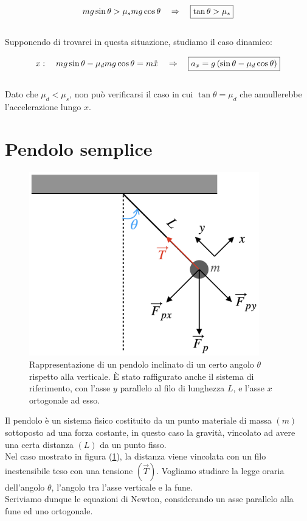 \begin{equation}
    mg\sin\theta > \mu_s mg\cos\theta\quad\Rightarrow\quad \boxed{\tan\theta>\mu_s}
\end{equation}
\\
Supponendo di trovarci in questa situazione, studiamo il caso dinamico:

\begin{equation}
    x:\quad mg\sin\theta -\mu_d mg\cos\theta = m\ddot x\quad\Rightarrow\quad
    \boxed{a_x = g\left(\sin\theta-\mu_d\cos\theta\right)}
\end{equation}
\\
Dato che $\mu_d<\mu_s$, non può verificarsi il caso in cui $\tan\theta
=\mu_d$ che annullerebbe l'accelerazione lungo $x$.

\section{Pendolo semplice}
\begin{figure}[htbp]
\center
        \includegraphics[width=10cm]{images/pendolo.png}
        \caption{Rappresentazione di un pendolo inclinato di un certo angolo
        $\theta$ rispetto alla verticale. È stato raffigurato anche il sistema
        di riferimento, con l'asse $y$ parallelo al filo di lunghezza $L$, e
        l'asse $x$ ortogonale ad esso.}
\label{fig:Iplain&pendulum:pendulum}
\end{figure}

Il pendolo è un sistema fisico costituito da un punto materiale di massa
$(m)$ sottoposto ad una forza costante, in questo caso la gravità, vincolato
ad avere una certa distanza $(L)$ da un punto fisso.\\
Nel caso mostrato in figura (\ref{fig:Iplain&pendulum:pendulum}), la distanza
viene vincolata con un filo inestensibile teso con una tensione $(\vec T)$.
Vogliamo studiare la legge oraria dell'angolo $\theta$, l'angolo tra l'asse
verticale e la fune.\\
Scriviamo dunque le equazioni di Newton, considerando un asse parallelo alla
fune ed uno ortogonale.

